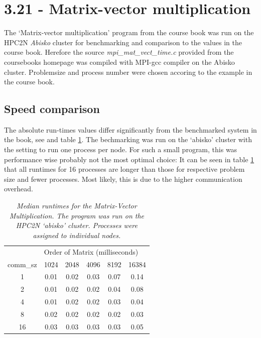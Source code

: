 \documentclass[a4paper,11pt,twoside]{article}
\begin{document}
\section{3.21 - Matrix-vector multiplication}
The `Matrix-vector multiplication' program from the course book was run on the HPC2N \textit{Abisko} cluster for benchmarking and comparison to the values in the course book. Herefore the source \textit{mpi\_mat\_vect\_time.c} provided from the coursebooks homepage was compiled with MPI-gcc compiler on the Abisko cluster. Problemsize and process number were chosen accoring to the example in the course book.

\subsection{Speed comparison}
The absolute run-times values differ significantly from the benchmarked system in the book, see \cite[p. 123]{pacheco2011} and table \ref{tab:runtimes}. The bechmarking was run on the `abisko' cluster with the setting to run one process per node. For such a small program, this was performance wise probably not the most optimal choice: It can be seen in table \ref{tab:runtimes} that all runtimes for 16 processes are longer than those for respective problem size and fewer processes. Most likely, this is due to the higher communication overhead.  
\begin{table}[]
\centering
\caption{\textit{Median runtimes for the Matrix-Vector Multiplication. The program was run on the HPC2N `abisko' cluster. Processes were assigned to individual nodes.}}
\label{tab:runtimes}
\begin{tabular}{cccccc}
\multicolumn{1}{l|}{}         & \multicolumn{5}{l|}{Order of Matrix (milliseconds)}                                                                   \\ \cline{2-6} 
\multicolumn{1}{l|}{comm\_sz} & \multicolumn{1}{c|}{1024} & \multicolumn{1}{c|}{2048} & \multicolumn{1}{c|}{4096} & \multicolumn{1}{c|}{8192} & 16384 \\
1                             & 0.01                      & 0.02                      & 0.03                      & 0.07                      & 0.14  \\
2                             & 0.01                      & 0.02                      & 0.02                      & 0.04                      & 0.08  \\
4                             & 0.01                      & 0.02                      & 0.02                      & 0.03                      & 0.04  \\
8                             & 0.02                      & 0.02                      & 0.02                      & 0.02                      & 0.03  \\
16                            & 0.03                      & 0.03                      & 0.03                      & 0.03                      & 0.05 
\end{tabular}
\end{table}
\end{document}
